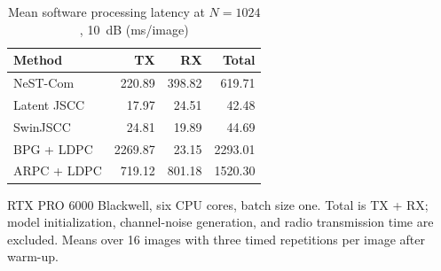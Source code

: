 \begin{table}[t]
\centering
\caption{Mean software processing latency at $N=1024$, 10~dB (ms/image)}
\label{tab:latency}
\begingroup
\footnotesize
\setlength{\tabcolsep}{3pt}
\renewcommand{\arraystretch}{1.15}
\begin{tabular}{@{}lrrr@{}}
\toprule
Method & TX & RX & Total \\
\midrule
NeST-Com & 220.89 & 398.82 & 619.71 \\[3pt]
Latent JSCC & 17.97 & 24.51 & 42.48 \\[3pt]
SwinJSCC & 24.81 & 19.89 & 44.69 \\[3pt]
BPG + LDPC & 2269.87 & 23.15 & 2293.01 \\[3pt]
ARPC + LDPC & 719.12 & 801.18 & 1520.30 \\
\bottomrule
\end{tabular}
\endgroup
\par\smallskip
\begin{minipage}{\columnwidth}\footnotesize
RTX PRO 6000 Blackwell, six CPU cores, batch size one. Total is TX + RX; model initialization, channel-noise generation, and radio transmission time are excluded. Means over 16 images with three timed repetitions per image after warm-up.
\end{minipage}
\end{table}
